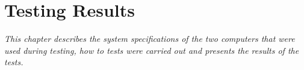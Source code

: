\chapter{Testing Results} \label{chap:results}
\textit{This chapter describes the system specifications of the two computers that were used during testing, how to tests were carried out and presents the results of the tests.}






